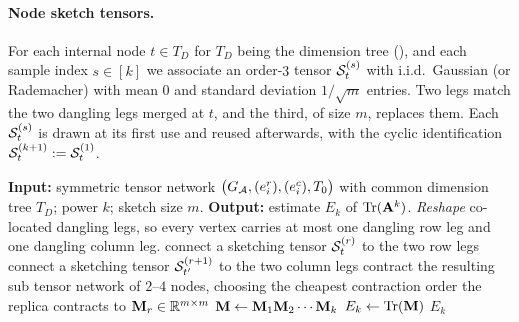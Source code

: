 \documentclass[11pt]{article}
\theoremstyle{plain}
\theoremstyle{definition}
\theoremstyle{remark}
\begin{document}
\paragraph{Node sketch tensors.}
For each internal node $t\in T_D$  for $T_D$ being the dimension tree (), and each sample index $s\in[k]$ we associate an
order-$3$ tensor $\mathcal{S}_t^{(s)}$ with i.i.d.\ Gaussian (or Rademacher) with mean $0$ and standard deviation $1/\sqrt{m}$ entries. Two legs match the two dangling legs merged at $t$, and the third, of size $m$, replaces them. Each $\mathcal{S}_t^{(s)}$ is drawn at its first use and reused afterwards, with the cyclic identification
$\mathcal{S}_t^{(k+1)}:=\mathcal{S}_t^{(1)}$.
\begin{algorithm}[H]
\caption{Sketched estimation of $\trace(\matA^{k})$ (general symmetric network)}
\label{alg:trace}
\begin{algorithmic}[1]
\STATE \textbf{Input:} symmetric tensor network $\bigl(G_{\mathcal{A}},(e_i^{r}),(e_i^{c}),T_0\bigr)$ with common dimension tree $T_D$; power $k$; sketch size $m$.
\STATE \textbf{Output:} estimate $E_k$ of $\trace(\matA^{k})$.
\STATE \emph{Reshape} co-located dangling legs, so every vertex carries at most one dangling row leg and one dangling column leg.
      \STATE connect a sketching tensor $\mathcal{S}_t^{(r)}$ to the two row legs
    \ENDIF
      \STATE connect a sketching tensor $\mathcal{S}_{t'}^{(r+1)}$ to the two column legs
    \ENDIF
    \STATE contract the resulting sub tensor network of $2$--$4$ nodes, choosing the cheapest contraction order
  \ENDFOR
  \STATE the replica contracts to $\mathbf{M}_r\in\mathbb{R}^{m\times m}$
\ENDFOR
\STATE $\mathbf{M}\gets\mathbf{M}_1\mathbf{M}_2\cdots\mathbf{M}_k$
\STATE $E_k\gets\mathop{\mathrm{Tr}}(\mathbf{M})$
\RETURN $E_k$
\end{algorithmic}
\end{algorithm}
\end{document}
